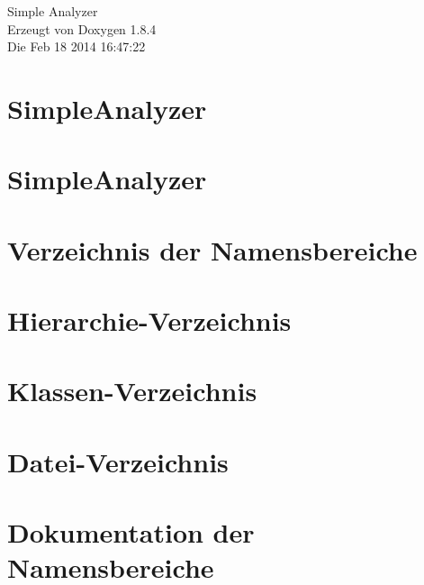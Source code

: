 \documentclass[twoside]{book}
\newcommand{\clearemptydoublepage}{%
  \newpage{\pagestyle{empty}\cleardoublepage}%
}
\begin{document}
\hypersetup{pageanchor=false}
\begin{titlepage}
\vspace*{7cm}
\begin{center}%
{\Large Simple Analyzer }\\
\vspace*{1cm}
{\large Erzeugt von Doxygen 1.8.4}\\
\vspace*{0.5cm}
{\small Die Feb 18 2014 16:47:22}\\
\end{center}
\end{titlepage}
\clearemptydoublepage
\tableofcontents
\clearemptydoublepage
{}
\hypersetup{pageanchor=true}

\chapter{Simple\-Analyzer}
\label{index}\hypertarget{index}{}
\chapter{Simple\-Analyzer}
\label{md__daten_Projekte_eclipse_workspace_README}
\hypertarget{md__daten_Projekte_eclipse_workspace_README}{}

\chapter{Verzeichnis der Namensbereiche}

\chapter{Hierarchie-\/\-Verzeichnis}

\chapter{Klassen-\/\-Verzeichnis}

\chapter{Datei-\/\-Verzeichnis}

\chapter{Dokumentation der Namensbereiche}


\end{document}
